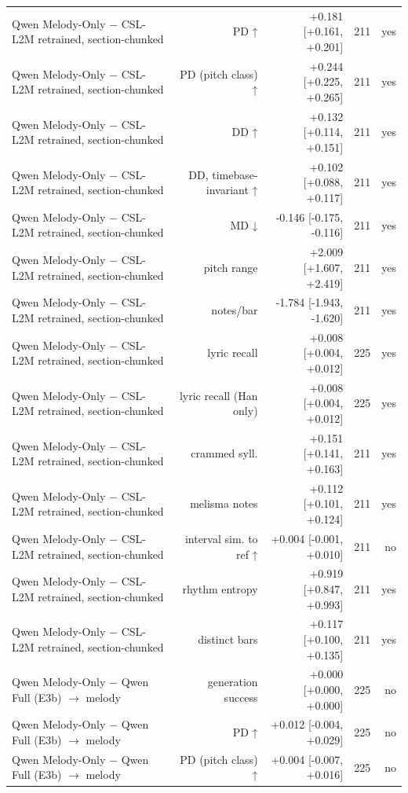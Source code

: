 \begin{table}[t]
\begin{tabular}{lrrrr}
Qwen Melody-Only $-$ CSL-L2M retrained, section-chunked & PD ↑ & +0.181 [+0.161, +0.201] & 211 & yes \\
Qwen Melody-Only $-$ CSL-L2M retrained, section-chunked & PD (pitch class) ↑ & +0.244 [+0.225, +0.265] & 211 & yes \\
Qwen Melody-Only $-$ CSL-L2M retrained, section-chunked & DD ↑ & +0.132 [+0.114, +0.151] & 211 & yes \\
Qwen Melody-Only $-$ CSL-L2M retrained, section-chunked & DD, timebase-invariant ↑ & +0.102 [+0.088, +0.117] & 211 & yes \\
Qwen Melody-Only $-$ CSL-L2M retrained, section-chunked & MD ↓ & -0.146 [-0.175, -0.116] & 211 & yes \\
Qwen Melody-Only $-$ CSL-L2M retrained, section-chunked & pitch range & +2.009 [+1.607, +2.419] & 211 & yes \\
Qwen Melody-Only $-$ CSL-L2M retrained, section-chunked & notes/bar & -1.784 [-1.943, -1.620] & 211 & yes \\
Qwen Melody-Only $-$ CSL-L2M retrained, section-chunked & lyric recall & +0.008 [+0.004, +0.012] & 225 & yes \\
Qwen Melody-Only $-$ CSL-L2M retrained, section-chunked & lyric recall (Han only) & +0.008 [+0.004, +0.012] & 225 & yes \\
Qwen Melody-Only $-$ CSL-L2M retrained, section-chunked & crammed syll. & +0.151 [+0.141, +0.163] & 211 & yes \\
Qwen Melody-Only $-$ CSL-L2M retrained, section-chunked & melisma notes & +0.112 [+0.101, +0.124] & 211 & yes \\
Qwen Melody-Only $-$ CSL-L2M retrained, section-chunked & interval sim. to ref ↑ & +0.004 [-0.001, +0.010] & 211 & no \\
Qwen Melody-Only $-$ CSL-L2M retrained, section-chunked & rhythm entropy & +0.919 [+0.847, +0.993] & 211 & yes \\
Qwen Melody-Only $-$ CSL-L2M retrained, section-chunked & distinct bars & +0.117 [+0.100, +0.135] & 211 & yes \\
Qwen Melody-Only $-$ Qwen Full (E3b) $\rightarrow$ melody & generation success & +0.000 [+0.000, +0.000] & 225 & no \\
Qwen Melody-Only $-$ Qwen Full (E3b) $\rightarrow$ melody & PD ↑ & +0.012 [-0.004, +0.029] & 225 & no \\
Qwen Melody-Only $-$ Qwen Full (E3b) $\rightarrow$ melody & PD (pitch class) ↑ & +0.004 [-0.007, +0.016] & 225 & no \\

\end{tabular}
\end{table}
